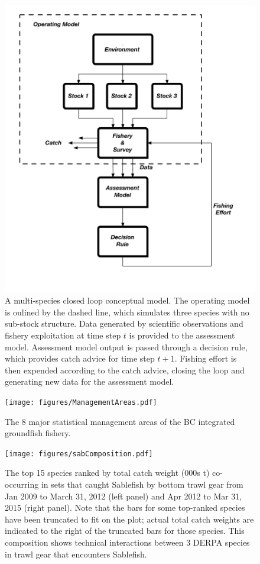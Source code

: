 \documentclass[]{scrartcl}
\begin{document}
\begin{figure}[htbp]
\centering
\includegraphics{figures/MSE.pdf}
\caption{A multi-species closed loop conceptual model. The operating model is oulined by the dashed line, which simulates three species with no sub-stock structure. Data generated by scientific observations and fishery exploitation at time step $t$ is provided to the assessment model. Assessment model output is passed through a decision rule, which provides catch advice for time step $t+1$. Fishing effort is then expended according to the catch advice, closing the loop and generating new data for the assessment model.}\label{fig:MSMSE}
\end{figure}\newpage

\begin{figure}[htbp]
\centering
\texttt{[image: figures/ManagementAreas.pdf]}
\caption{The 8 major statistical management areas of the BC integrated groundfish fishery.}\label{fig:statAreas}
\end{figure}\newpage

\begin{figure}[htbp]
\centering
\texttt{[image: figures/sabComposition.pdf]}
\caption{The top 15 species ranked by total catch weight (000s t) co-occurring in sets that caught Sablefish by bottom trawl gear from Jan 2009 to March 31, 2012 (left panel) and Apr 2012 to Mar 31, 2015 (right panel). Note that the bars for some top-ranked species have been truncated to fit on the plot; actual total catch weights are indicated to the right of the truncated bars for those species. This composition shows technical interactions between 3 DERPA species in trawl gear that encounters Sablefish.}\label{fig:catchComposition}
\end{figure}\newpage
\end{document}
